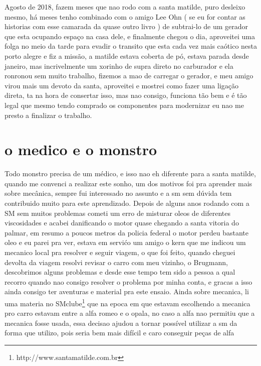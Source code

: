 \documentclass[a4paper]{report}
\begin{document}
Agosto de 2018, fazem meses que nao rodo com a santa matilde, puro desleixo mesmo, h\'a meses tenho combinado com o amigo Lee Ohn ( se eu for contar as historias com esse camarada da quase outro livro ) de subtrai-lo de um gerador que esta ocupando espa\c{c}o na casa dele, e finalmente chegou o dia, aproveitei uma folga no meio da tarde para evadir o transito que esta cada vez mais ca\'otico nesta porto alegre e fiz a miss\~ao, a matilde estava coberta de p\'o, estava parada desde janeiro, mas incrivelmente um xorinho de supra direto no carburador e ela ronronou sem muito trabalho, fizemos a mao de carregar o gerador, e meu amigo virou mais um devoto da santa, aproveitei e mostrei como fazer uma liga\c{c}\~ao direta, ta na hora de consertar isso, mas nao consigo, funciona t\~ao bem e \'e t\~ao legal que mesmo tendo comprado os componentes para modernizar eu nao me presto a finalizar o trabalho. 

\section*{o medico e o monstro}

Todo monstro precisa de um m\'edico, e isso nao eh diferente para a santa matilde, quando me convenci a realizar este sonho, um dos motivos foi pra
aprender mais sobre mec\^anica, sempre fui interessado no assunto e a sm sem d\'uvida tem contribuido muito para este aprendizado.
Depois de alguns anos rodando com a SM sem muitos problemas cometi um erro de misturar oleos de diferentes viscosidades e acabei danificando o motor quase chegando a santa vitoria do palmar, em resumo a poucos metros da policia federal o motor perdeu bastante oleo e eu parei pra ver, estava em servi\'co um amigo o kern que me indicou um mecanico local pra resolver e seguir viagem, o que foi feito, quando cheguei devolta da viagem resolvi revisar o carro com meu vizinho, o Brugmann, descobrimos alguns problemas e desde esse tempo tem sido a pessoa a qual recorro quando nao consigo resolver o problema por minha conta, e gracas a isso ainda consigo ter aventuras e material pra este ensaio.
Ainda sobre mecanica, li uma materia no SMclube\footnote{http://www.santamatilde.com.br} que na epoca em que estavam escolhendo a mecanica pro carro estavam entre a alfa romeo e o opala, no caso a alfa nao permitiu que a mecanica fosse usada,  essa decisao ajudou a tornar poss\'ivel  utilizar a sm da forma que utilizo, pois seria bem mais dif\'icil e caro conseguir pe\c{c}as de alfa


\end{document}
